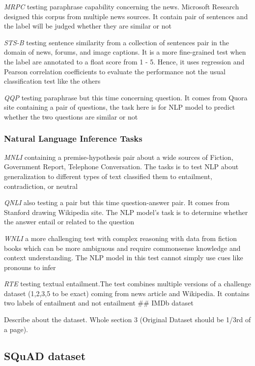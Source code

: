 \documentclass[
  11pt,
]{article}
\begin{document}
\emph{MRPC} testing paraphrase capability concerning the news. Microsoft
Research designed this corpus from multiple news sources. It contain
pair of sentences and the label will be judged whether they are similar
or not

\emph{STS-B} testing sentence similarity from a collection of sentences
pair in the domain of news, forums, and image captions. It is a more
fine-grained test when the label are annotated to a float score from 1 -
5. Hence, it uses regression and Pearson correlation coefficients to
evaluate the performance not the usual classification test like the
others

\emph{QQP} testing paraphrase but this time concerning question. It
comes from Quora site containing a pair of questions, the task here is
for NLP model to predict whether the two questions are similar or not

\subsubsection{Natural Language Inference
Tasks}\label{natural-language-inference-tasks}

\emph{MNLI} containing a premise-hypothesis pair about a wide sources of
Fiction, Government Report, Telephone Conversation. The tasks is to test
NLP about generalization to different types of text classified them to
entailment, contradiction, or neutral

\emph{QNLI} also testing a pair but this time question-answer pair. It
comes from Stanford drawing Wikipedia site. The NLP model's task is to
determine whether the answer entail or related to the question

\emph{WNLI} a more challenging test with complex reasoning with data
from fiction books which can be more ambiguous and require commonsense
knowledge and context understanding. The NLP model in this test cannot
simply use cues like pronouns to infer

\emph{RTE} testing textual entailment.The test combines multiple
versions of a challenge dataset (1,2,3,5 to be exact) coming from news
article and Wikipedia. It contains two labels of entailment and not
entailment \#\# IMDb dataset

Describe about the dataset. Whole section 3 (Original Dataset should be
1/3rd of a page).

\subsection{SQuAD dataset}\label{squad-dataset}
\end{document}
